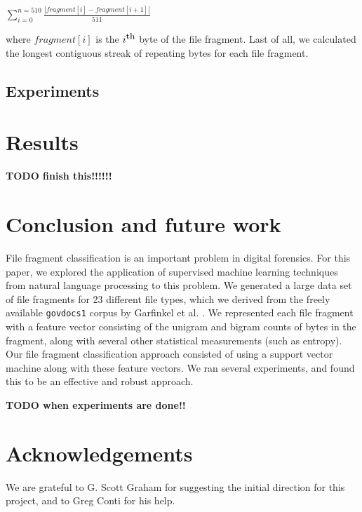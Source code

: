 \documentclass[letter,11pt]{article}
\begin{document}
\begin{center}
 $\sum_{i=0}^{n=510}\frac{|fragment[i] - fragment[i+1]|}{511}$
\end{center}

{\noindent}where $fragment[i]$ is the $i^\textrm{\small th}$ byte of the file fragment. Last of all, we calculated the longest contiguous streak of repeating bytes for each file fragment.

\subsection{Experiments}
\label{Subsection:Experiments}






\section{Results}
\label{Section:Results}
\textbf{TODO finish this!!!!!!}

\section{Conclusion and future work}
\label{Section:ConclusionAndFutureWork}
File fragment classification is an important problem in digital forensics. For this paper, we explored the application of supervised machine learning techniques from natural language processing to this problem. We generated a large data set of file fragments for 23 different file types, which we derived from the freely available \texttt{govdocs1} corpus by Garfinkel et al. \cite{Garfinkel09}. We represented each file fragment with a feature vector consisting of the unigram and bigram counts of bytes in the fragment, along with several other statistical measurements (such as entropy). Our file fragment classification approach consisted of using a support vector machine along with these feature vectors. We ran several experiments, and found this to be an effective and robust approach.

\textbf{TODO when experiments are done!!}

\section*{Acknowledgements}
We are grateful to G. Scott Graham for suggesting the initial direction for this project, and to Greg Conti for his help.


\newpage


\end{document}
